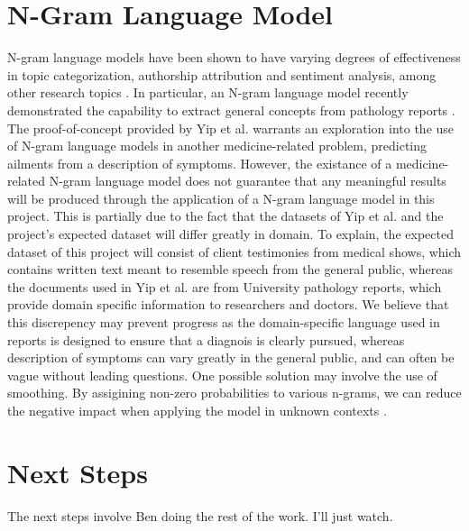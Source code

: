 \documentclass[12pt, final, onecolumn, comsoc, conference]{IEEEtran}
\begin{document}
\section{N-Gram Language Model}
N-gram language models have been shown to have varying degrees of effectiveness in topic categorization,
authorship attribution and sentiment analysis, among other research topics \cite{n-gram-analysis}. In particular, an N-gram language
model recently demonstrated the capability to extract general concepts from pathology reports \cite{yip}.
The proof-of-concept provided by Yip et al. warrants an exploration into the use of N-gram language models
in another medicine-related problem, predicting ailments from a description of symptoms.
However, the existance of a medicine-related N-gram language model does not guarantee that any
meaningful results will be produced through the application of a N-gram language model in this project.
This is partially due to the fact that the datasets of Yip et al. and the project's expected dataset will differ
greatly in domain.
To explain, the expected dataset of this project will consist of client testimonies from medical shows,
which contains written text meant to resemble speech from the general public,
whereas the documents used in Yip et al. are from University pathology reports,
which provide domain specific information to researchers and doctors.
We believe that this discrepency may prevent progress as the domain-specific language used in reports
is designed to ensure that a diagnois is clearly pursued, whereas description of symptoms can vary greatly
in the general public, and can often be vague without leading questions.
One possible solution may involve the use of smoothing. By assigining non-zero
probabilities to various n-grams, we can reduce the negative impact when applying the model in unknown contexts \cite{class}.

\section{Next Steps}
The next steps involve Ben doing the rest of the work. I'll just watch.


\end{document}
